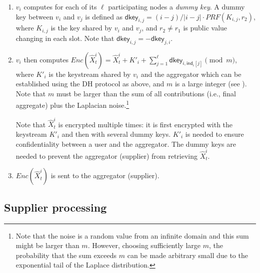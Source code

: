\documentclass[11pt,a4paper]{article}
\theoremstyle{plain}
\theoremstyle{plain}
\theoremstyle{plain}
\theoremstyle{plain}
\theoremstyle{nonumberplain} \theoremseparator{}
\begin{document}
\begin{description}
\begin{enumerate}
\item $v_i$ computes for each of its $\ell$ participating nodes a {\em dummy key}. A dummy key between $v_i$ and $v_j$ is defined as $\mathsf{dkey}_{i,j}= (i-j)/|i-j|\cdot\mathit{PRF}(K_{i,j}, r_{2})$, where $K_{i,j}$ is 
the key shared by $v_i$ and $v_j$, and $r_{2} \neq r_{1}$ is public value changing in each slot.  Note that $\mathsf{dkey}_{i,j}= -\mathsf{dkey}_{j,i}$.

\item $v_i$ then computes 
$\mathit{Enc}(\hat{X}_{t}^{i}) = \hat{X}_{t}^{i}  + K'_i + \sum^\ell_{j=1} \mathsf{dkey}_{i,\mathsf{ind}_i[j]} \pmod{m}$, where $K'_i$ is the keystream shared by $v_i$ and the aggregator which can be established using the DH protocol as above, and $m$ is a large integer (see \cite{cc05mobiquitous}). Note that $m$ must be larger than the sum of all contributions (i.e., final aggregate) plus the Laplacian noise.\footnote{Note that the noise is a random value from an infinite domain and this sum might be larger than $m$. However, choosing sufficiently large $m$, the probability that the sum exceeds $m$ can be made arbitrary small due to the exponential tail of the Laplace distribution.}  

Note that $\hat{X}_{t}^{i}$ is encrypted multiple times: it is first encrypted with the keystream $K'_i$
and then with several dummy keys. $K'_i$ is needed to ensure confidentiality between a user and the aggregator. 
The dummy keys are needed to prevent the aggregator (supplier) from retrieving $\hat{X}_{t}^{i}$.
\item $\mathit{Enc}(\hat{X}_{t}^{i})$ is sent to the aggregator (supplier).
\end{enumerate}
\end{description}

\subsection{Supplier processing}
\end{document}
